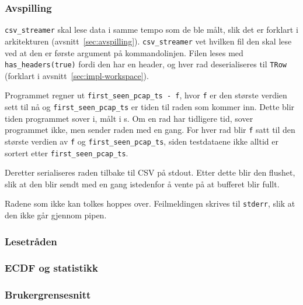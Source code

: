 \documentclass[norsk]{uiobachelorthesis}
\begin{document}
\subsubsection{Avspilling}
\label{sec:impl-avspilling}
\texttt{csv\_streamer} skal lese data i samme tempo som de ble målt, slik det er forklart i arkitekturen (avsnitt~\ref{sec:avspilling}). \texttt{csv\_streamer} vet hvilken fil den skal lese ved at den er første argument på kommandolinjen. Filen leses med \texttt{has\_headers(true)} fordi den har en header, og hver rad deserialiseres til \texttt{TRow} (forklart i avsnitt~\ref{sec:impl-workspace}).

Programmet regner ut \texttt{first\_seen\_pcap\_ts - f}, hvor \texttt{f} er den største verdien sett til nå og \texttt{first\_seen\_pcap\_ts} er tiden til raden som kommer inn. Dette blir tiden programmet sover i, målt i \textmu{}s. Om en rad har tidligere tid, sover programmet ikke, men sender raden med en gang. For hver rad blir \texttt{f} satt til den største verdien av \texttt{f} og \texttt{first\_seen\_pcap\_ts}, siden testdataene ikke alltid er sortert etter \texttt{first\_seen\_pcap\_ts}.

Deretter serialiseres raden tilbake til CSV på stdout. Etter dette blir den flushet, slik at den blir sendt med en gang istedenfor å vente på at bufferet blir fullt.

Radene som ikke kan tolkes hoppes over. Feilmeldingen skrives til \texttt{stderr}, slik at den ikke går gjennom pipen.
\subsubsection{Lesetråden}
\label{sec:impl-lesetrad}


\subsubsection{ECDF og statistikk}
\label{sec:impl-ecdf}

\subsubsection{Brukergrensesnitt}
\label{sec:impl-gui}
\end{document}

